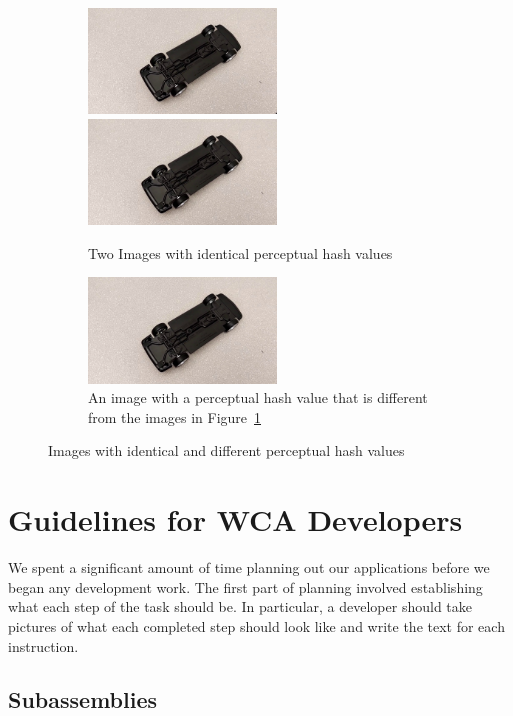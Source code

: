 \begin{figure}
  \begin{subfigure}{\textwidth}
    \includegraphics[width=5cm]{figures/perceptual_hash/identical1.jpg}
    \includegraphics[width=5cm]{figures/perceptual_hash/identical2.jpg}
    \caption{Two Images with identical perceptual hash values
    }\label{fig:perceptual_hash_identical}
  \end{subfigure}
  \begin{subfigure}{\textwidth}
    \includegraphics[width=5cm]{figures/perceptual_hash/identical2.jpg}
    \caption{An image with a perceptual hash value that is different from the
    images in Figure~\ref{fig:perceptual_hash_identical}}
  \end{subfigure}
  \caption{Images with identical and different perceptual hash values
  }\label{fig:perceptual_hash}
\end{figure}

\section{Guidelines for WCA Developers}

We spent a significant amount of time planning out our applications before we
began any development work.
The first part of planning involved establishing what each step of the task
should be.
In particular, a developer should take pictures of what each completed step
should look like and write the text for each instruction.

\subsection{Subassemblies}


